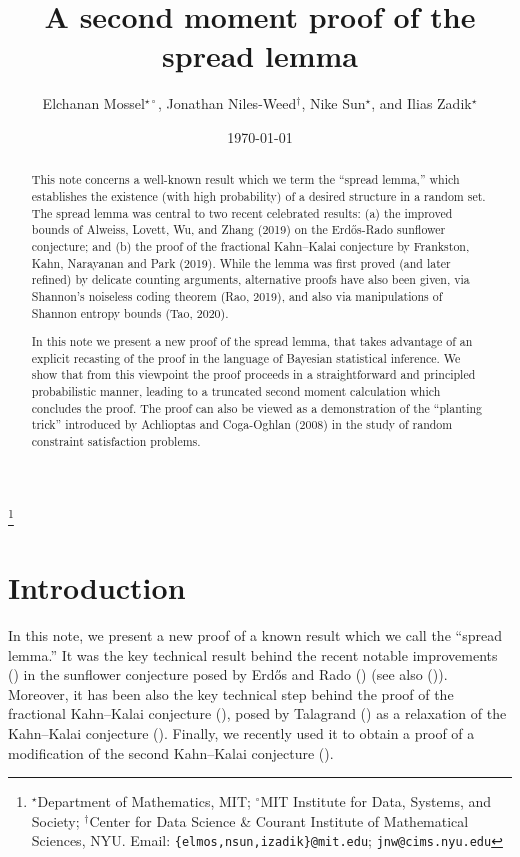 \documentclass[11pt,reqno]{amsart}
\theoremstyle{plain}
\theoremstyle{definition}
\theoremstyle{remark}
\begin{document}
	
\title{A second moment proof of the spread lemma}


\author[E.\ Mossel, J.\ Niles-Weed, N.\ Sun, I.\ Zadik]{Elchanan Mossel$^{\star\circ}$, Jonathan Niles-Weed$^\dagger$, Nike Sun$^\star$, and Ilias Zadik$^\star$}
\thanks{$^\star$Department of Mathematics, MIT;
$^\circ$MIT Institute for Data, Systems, and Society;
$^\dagger$Center for Data Science \& Courant Institute of Mathematical Sciences, NYU. Email: \texttt{\{elmos,nsun,izadik\}@mit.edu}; \texttt{jnw@cims.nyu.edu}}




\date{\today}

\begin{abstract} 
This note concerns a well-known result which we term the ``spread lemma,'' which establishes the existence (with high probability) of a desired structure in a random set. The spread lemma was central to two recent celebrated results: (a) the improved bounds of Alweiss, Lovett, Wu, and Zhang (2019) on the Erd\H{o}s-Rado sunflower conjecture; and (b) the proof of the fractional Kahn--Kalai conjecture by Frankston, Kahn, Narayanan and Park (2019).  While the lemma was first proved (and later refined) by delicate counting arguments, alternative proofs have also been given, via Shannon's noiseless coding theorem (Rao, 2019), and also via manipulations of Shannon entropy bounds (Tao, 2020). 

In this note we present a new proof of the spread lemma, that takes advantage of an explicit recasting of the proof in the language of Bayesian statistical inference. We show that from this viewpoint the proof proceeds in a straightforward and principled probabilistic manner, leading to a truncated second moment calculation which concludes the proof. The proof can also be viewed as a demonstration of the ``planting trick'' introduced by Achlioptas and Coga-Oghlan (2008) in the study of random constraint satisfaction problems. 
\end{abstract}

\maketitle

\section{Introduction}

 In this note, we present a new proof of a known result which we call the ``spread lemma.''  It was the key technical result behind the recent notable improvements (\cite{sunflower_annals}) in the sunflower conjecture posed by Erd\H{o}s and Rado (\cite{erdos1960intersection}) (see also (\cite{bell2021note})). Moreover, it has been also the key technical step behind the proof of the fractional Kahn--Kalai conjecture (\cite{fracKK_annals}), posed by Talagrand (\cite{MR2743011}) as a relaxation of the Kahn--Kalai conjecture (\cite{kahn2007thresholds}). Finally, we recently used it to obtain a proof of a modification of the second Kahn--Kalai conjecture (\cite{mossel2022second}). 
\end{document}
